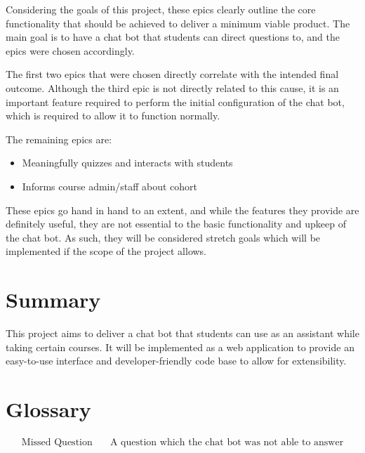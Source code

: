 \documentclass{article}
\begin{document}
Considering the goals of this project, these epics clearly outline the core functionality that should be achieved to deliver a minimum viable product. The main goal is to have a chat bot that students can direct questions to, and the epics were chosen accordingly.

The first two epics that were chosen directly correlate with the intended final outcome. Although the third epic is not directly related to this cause, it is an important feature required to perform the initial configuration of the chat bot, which is required to allow it to function normally.

The remaining epics are:
\begin{itemize}
  \item Meaningfully quizzes and interacts with students
  \item Informs course admin/staff about cohort
\end{itemize}

These epics go hand in hand to an extent, and while the features they provide are definitely useful, they are not essential to the basic functionality and upkeep of the chat bot. As such, they will be considered stretch goals which will be implemented if the scope of the project allows.


\section{Summary}

This project aims to deliver a chat bot that students can use as an assistant while taking certain courses. It will be implemented as a web application to provide an easy-to-use interface and developer-friendly code base to allow for extensibility. 

\section{Glossary}

\begin{align*}
  \text{Missed Question}    \quad   &\text{A question which the chat bot was not able to answer}
\end{align*}
\end{document}
